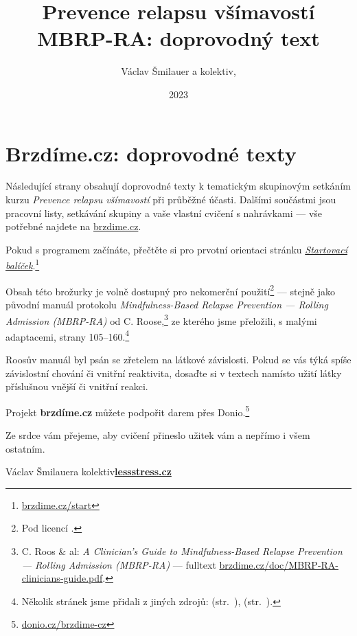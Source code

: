 \documentclass[11pt,a5paper,twoside]{article}
\title{Prevence relapsu všímavostí MBRP-RA: doprovodný text}
\date{2023}
\author{Václav Šmilauer a kolektiv, \lessstressLogo}
\def\lessstressLogo{\href{https://lessstress.cz}{\textsf{\textbf{le\uline{\uline{\uline{s}s}s}tre\uline{\uline{s}s}.cz\uline{\hphantom{s}}}}}}
\begin{document}
	\thispagestyle{empty}
	\section*{Brzdíme.cz: doprovodné texty}

	\vskip-3mm
	Následující strany obsahují doprovodné texty k tematickým skupinovým setkáním kurzu \emph{Prevence relapsu všímavostí} při průběžné účasti. Dalšími součástmi jsou pracovní listy, setkávání skupiny a vaše vlastní cvičení s nahrávkami — vše potřebné najdete na \href{https://brzdime.cz}{brzdime.cz}.

	Pokud s programem začínáte, přečtěte si pro prvotní orientaci stránku \href{https://brzdime.cz/start}{\emph{Startovací balíček}}.\footnote{\href{https://brzdime.cz/start}{brzdime.cz/start}}

	Obsah této brožurky je volně dostupný pro nekomerční použití\footnote{Pod licencí \doclicenseNameRef.} — stejně jako původní manuál protokolu \emph{Mindfulness-Based Relapse Prevention — Rolling Admission (MBRP-RA)} od C. Roose,\footnote{C. Roos \& al: \emph{A Clinician's Guide to Mindfulness-Based Relapse Prevention — Rolling Admission (MBRP-RA)} — fulltext \href{https://brzdime.cz/doc/MBRP-RA-clinicians-guide.pdf}{brzdime.cz/doc/MBRP-RA-clinicians-guide.pdf}.} ze kterého jsme přeložili, s malými adaptacemi, strany 105–160.\footnote{Několik stránek jsme přidali z jiných zdrojů:
		 (str.~\pageref{slovni-zasoba-pocity}),
		 (str.~\pageref{slovni-zasoba-potreby}).
	}

	Roosův manuál byl psán se zřetelem na látkové závislosti. Pokud se vás týká spíše závislostní chování či vnitřní reaktivita, dosaďte si v textech namísto užití látky příslušnou vnější či vnitřní reakci.

	Projekt \textbf{brzdíme.cz} můžete podpořit darem přes Donio.\footnote{\href{https://donio.cz/brzdime-cz}{donio.cz/brzdime-cz}}

	Ze srdce vám přejeme, aby cvičení přineslo užitek vám a nepřímo i všem ostatním.

	\hfill Václav Šmilauer\linebreak\null\hfill a kolektiv\linebreak\null\hfill\lessstressLogo

	\setlength{\cftbeforesecskip}{1ex}
	\clearpage
	\tableofcontents
	\thispagestyle{empty}

	
	
\end{document}
